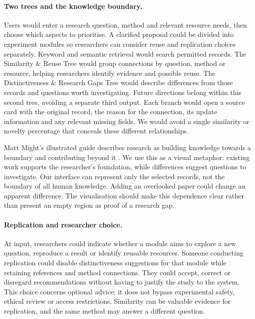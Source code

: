 \documentclass[11pt,a4paper]{article}
\begin{document}
\paragraph{Two trees and the knowledge boundary.}
Users would enter a research question, method and relevant resource needs, then choose which aspects to prioritise. A clarified proposal could be divided into experiment modules so researchers can consider reuse and replication choices separately. Keyword and semantic retrieval would search permitted records. The Similarity \& Reuse Tree would group connections by question, method or resource, helping researchers identify evidence and possible reuse. The Distinctiveness \& Research Gaps Tree would describe differences from those records and questions worth investigating. Future directions belong within this second tree, avoiding a separate third output. Each branch would open a source card with the original record, the reason for the connection, its update information and any relevant missing fields. We would avoid a single similarity or novelty percentage that conceals these different relationships.

Matt Might's illustrated guide describes research as building knowledge towards a boundary and contributing beyond it \citep{might}. We use this as a visual metaphor: existing work supports the researcher's foundation, while differences suggest questions to investigate. Our interface can represent only the selected records, not the boundary of all human knowledge. Adding an overlooked paper could change an apparent difference. The visualisation should make this dependence clear rather than present an empty region as proof of a research gap.

\paragraph{Replication and researcher choice.}
At input, researchers could indicate whether a module aims to explore a new question, reproduce a result or identify reusable resources. Someone conducting replication could disable distinctiveness suggestions for that module while retaining references and method connections. They could accept, correct or disregard recommendations without having to justify the study to the system. This choice concerns optional advice; it does not bypass experimental safety, ethical review or access restrictions. Similarity can be valuable evidence for replication, and the same method may answer a different question.
\end{document}
